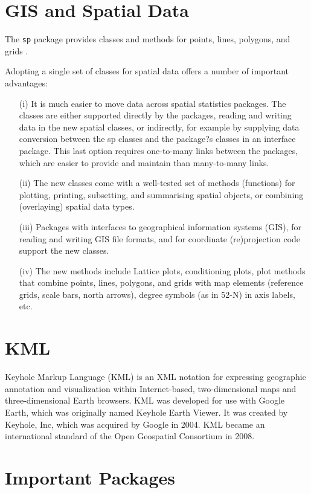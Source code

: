 \documentclass[a4paper,12pt]{article}
\begin{document}
\begin{description}
\section{GIS and Spatial Data}
The \texttt{sp} package provides classes and methods for points, lines, polygons, and grids . 

Adopting a single set of classes for spatial data
offers a number of important advantages:
\begin{itemize}
\item[(i)] It is much easier to move data across spatial statistics packages. The
classes are either supported directly by the packages, reading and writing
data in the new spatial classes, or indirectly, for example by supplying
data conversion between the sp classes and the package?s classes in an
interface package. This last option requires one-to-many links between the
packages, which are easier to provide and maintain than many-to-many
links.
\item[(ii)] The new classes come with a well-tested set of methods (functions) for
plotting, printing, subsetting, and summarising spatial objects, or combining
(overlaying) spatial data types.
\item[(iii)] Packages with interfaces to geographical information systems (GIS), for
reading and writing GIS file formats, and for coordinate (re)projection
code support the new classes.
\item[(iv)] The new methods include Lattice plots, conditioning plots, plot methods
that combine points, lines, polygons, and grids with map elements (reference
grids, scale bars, north arrows), degree symbols (as in 52-N) in axis
labels, etc.
\end{itemize}

\section{KML}
Keyhole Markup Language (KML) is an XML notation for expressing geographic annotation and visualization within Internet-based, two-dimensional maps and three-dimensional Earth browsers. KML was developed for use with Google Earth, which was originally named Keyhole Earth Viewer. It was created by Keyhole, Inc, which was acquired by Google in 2004. 
KML became an international standard of the Open Geospatial Consortium in 2008.
\section{Important Packages}



\end{description}
\end{document}
